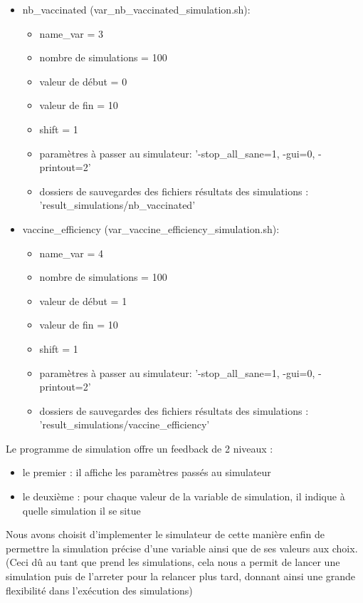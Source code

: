 \documentclass[a4paper, 11pt]{article}
\begin{document}
\begin{itemize}
				\item nb\_vaccinated (var\_nb\_vaccinated\_simulation.sh):
				\begin{itemize}
					\item name\_var = 3
					\item nombre de simulations = 100
					\item valeur de début = 0
					\item valeur de fin = 10
					\item shift = 1
					\item paramètres à passer au simulateur: '-stop\_all\_sane=1, -gui=0, -printout=2'
					\item dossiers de sauvegardes des fichiers résultats des simulations : 'result\_simulations/nb\_vaccinated'
				\end{itemize}
				
				\item vaccine\_efficiency (var\_vaccine\_efficiency\_simulation.sh):
				\begin{itemize}
					\item name\_var = 4
					\item nombre de simulations = 100
					\item valeur de début = 1
					\item valeur de fin = 10
					\item shift = 1
					\item paramètres à passer au simulateur: '-stop\_all\_sane=1, -gui=0, -printout=2'
					\item dossiers de sauvegardes des fichiers résultats des simulations : 'result\_simulations/vaccine\_efficiency'
				\end{itemize}
			\end{itemize}


			Le programme de simulation offre un feedback de 2 niveaux :
			\begin{itemize}
				\item le premier : il affiche les paramètres passés au simulateur
				\item le deuxième : pour chaque valeur de la variable de simulation, il indique à quelle simulation il se situe
			\end{itemize}

			Nous avons choisit d'implementer le simulateur de cette manière enfin de permettre la simulation précise d'une variable ainsi que de ses valeurs aux choix. (Ceci dû au tant que prend les simulations, cela nous a permit de lancer une simulation puis de l'arreter pour la relancer plus tard, donnant ainsi une grande flexibilité dans l'exécution des simulations)
\end{document}
